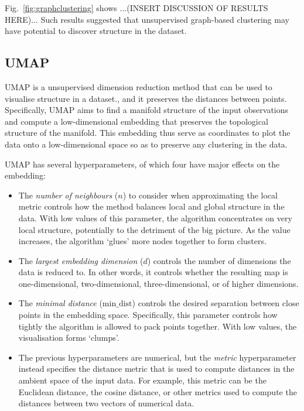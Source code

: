 Fig.\ \ref{fig:graphclustering} shows ...(INSERT DISCUSSION OF RESULTS HERE)...
Such results suggested that unsupervised graph-based clustering may have potential to discover structure in the dataset.


\subsection{UMAP}
\label{subsec:analysis-clustering-umap}

UMAP \parencite{mcinnesUMAPUniformManifold2020} is a unsupervised dimension reduction method that can be used to visualise structure in a dataset., and it preserves the distances between points.
Specifically, UMAP aims to find a manifold structure of the input observations and compute a low-dimensional embedding that preserves the topological structure of the manifold.
This embedding thus serve as coordinates to plot the data onto a low-dimensional space so as to preserve any clustering in the data.

UMAP has several hyperparameters, of which four have major effects on the embedding:
\begin{itemize}
  \item The \emph{number of neighbours} ($n$) to consider when approximating the local metric controls how the method balances local and global structure in the data.
        With low values of this parameter, the algorithm concentrates on very local structure, potentially to the detriment of the big picture.
        As the value increases, the algorithm `glues' more nodes together to form clusters.
  \item The \emph{largest embedding dimension} ($d$) controls the number of dimensions the data is reduced to.
        In other words, it controls whether the resulting map is one-dimensional, two-dimensional, three-dimensional, or of higher dimensions.
  \item The \emph{minimal distance} ($\mathrm{min\_dist}$) controls the desired separation between close points in the embedding space.
        Specifically, this parameter controls how tightly the algorithm is allowed to pack points together.
        With low values, the visualisation forms `clumps'.
  \item The previous hyperparameters are numerical, but the \emph{metric} hyperparameter instead specifies the distance metric that is used to compute distances in the ambient space of the input data.
        For example, this metric can be the Euclidean distance, the cosine distance, or other metrics used to compute the distances between two vectors of numerical data.
\end{itemize}

